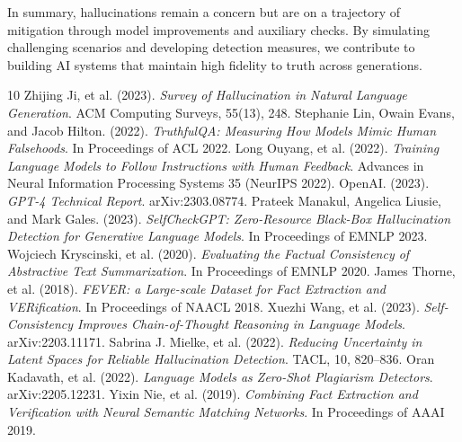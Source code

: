 \documentclass{article}
\begin{document}
In summary, hallucinations remain a concern but are on a trajectory of mitigation through model improvements and auxiliary checks. By simulating challenging scenarios and developing detection measures, we contribute to building AI systems that maintain high fidelity to truth across generations.

\begin{thebibliography}{10}\setlength{\itemsep}{-1mm}
 Zhijing Ji, et al. (2023). \textit{Survey of Hallucination in Natural Language Generation}. ACM Computing Surveys, 55(13), 248.
 Stephanie Lin, Owain Evans, and Jacob Hilton. (2022). \textit{TruthfulQA: Measuring How Models Mimic Human Falsehoods}. In Proceedings of ACL 2022.
 Long Ouyang, et al. (2022). \textit{Training Language Models to Follow Instructions with Human Feedback}. Advances in Neural Information Processing Systems 35 (NeurIPS 2022).
 OpenAI. (2023). \textit{GPT-4 Technical Report}. arXiv:2303.08774.
 Prateek Manakul, Angelica Liusie, and Mark Gales. (2023). \textit{SelfCheckGPT: Zero-Resource Black-Box Hallucination Detection for Generative Language Models}. In Proceedings of EMNLP 2023.
 Wojciech Kryscinski, et al. (2020). \textit{Evaluating the Factual Consistency of Abstractive Text Summarization}. In Proceedings of EMNLP 2020.
 James Thorne, et al. (2018). \textit{FEVER: a Large-scale Dataset for Fact Extraction and VERification}. In Proceedings of NAACL 2018.
 Xuezhi Wang, et al. (2023). \textit{Self-Consistency Improves Chain-of-Thought Reasoning in Language Models}. arXiv:2203.11171.
 Sabrina J. Mielke, et al. (2022). \textit{Reducing Uncertainty in Latent Spaces for Reliable Hallucination Detection}. TACL, 10, 820--836.
 Oran Kadavath, et al. (2022). \textit{Language Models as Zero-Shot Plagiarism Detectors}. arXiv:2205.12231.
 Yixin Nie, et al. (2019). \textit{Combining Fact Extraction and Verification with Neural Semantic Matching Networks}. In Proceedings of AAAI 2019.
\end{thebibliography}
\end{document}
